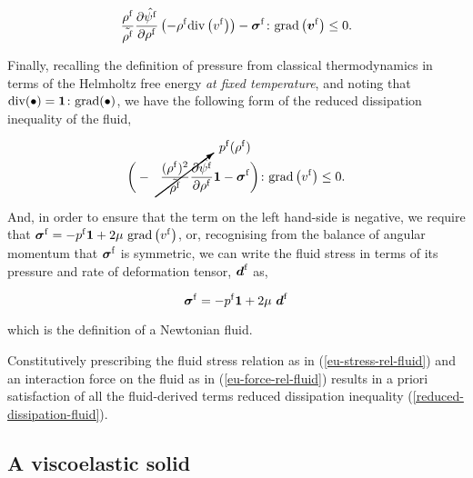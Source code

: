 \begin{equation*}
\frac{\rho^{\mathrm{f}}}{\tilde{\rho^{\mathrm{f}}}}
\frac{\partial \hat{\psi^{\mathrm{f}}}}{\partial \rho^{\mathrm{f}}}
\left(- \rho^{\mathrm{f}} \mathrm{div}\left( v^{\mathrm{f}}
\right)\right) 
-\mbox{\boldmath$\sigma$}^{\mathrm{f}}\colon\mathrm{grad}
\left(\mbox{\boldmath$ v$}^{\mathrm{f}}\right)
\leq 0.
\end{equation*}

Finally, recalling the definition of pressure from classical
thermodynamics in terms of the Helmholtz free energy {\em at fixed
  temperature}, and noting that \mbox{$\mathrm{div}(\bullet) =
{\bf 1}\colon\mathrm{grad}(\bullet)$}, we have the following form of the
reduced dissipation inequality of the fluid,

\begin{equation*}
\bigg( - \cancelto{p^{\mathrm{f}}(\rho^{\mathrm{f}})}
{\frac{(\rho^{\mathrm{f}})^2}{\tilde{\rho^{\mathrm{f}}}}
\frac{\partial \hat{\psi^{\mathrm{f}}}}{\partial \rho^{\mathrm{f}}}}
\bone -\Bsigma^{\mathrm{f}} \bigg) \colon \mathrm{grad}\left( v^{\mathrm{f}}
\right)
\leq 0.
\end{equation*}

\noindent And, in order to ensure that the term on the left hand-side
is negative, we require that $\mbox{\boldmath$\sigma$}^{\mathrm{f}} = -
p^{\mathrm{f}} {\bf 1} + 2 \mu \ \mathrm{grad}\left( v^{\mathrm{f}}
\right)$, or, recognising from the balance of angular momentum that
$\mbox{\boldmath$\sigma$}^{\mathrm{f}}$ is symmetric, we can write the fluid stress in
terms of its pressure and rate of deformation tensor,
$\mbox{\boldmath$ d$}^{\mathrm{f}}$ as, 

\begin{equation}
\mbox{\boldmath$\sigma$}^{\mathrm{f}} = -
p^{\mathrm{f}} {\bf 1} + 2 \mu \ \mbox{\boldmath$ d$}^{\mathrm{f}}
\label{eu-stress-rel-fluid}
\end{equation}

\noindent which is the definition of a Newtonian fluid.

Constitutively prescribing the fluid stress relation as in
(\ref{eu-stress-rel-fluid}) and an interaction force on the fluid as
in (\ref{eu-force-rel-fluid}) results in a priori satisfaction of all
the fluid-derived terms reduced dissipation inequality
(\ref{reduced-dissipation-fluid}).


\subsection{A viscoelastic solid}
\label{eu-viscoelastic-solid}


